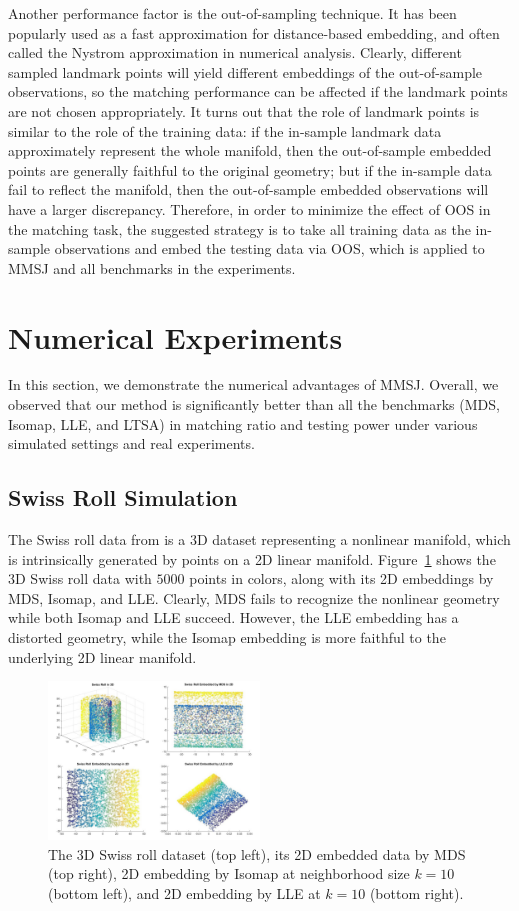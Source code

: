 \documentclass[times,twocolumn,final]{elsarticle}
\begin{document}
Another performance factor is the out-of-sampling technique. It has been popularly used as a fast approximation for distance-based embedding, and often called the Nystrom approximation \cite{Mahoney2005} in numerical analysis. Clearly, different sampled landmark points will yield different embeddings of the out-of-sample observations, so the matching performance can be affected if the landmark points are not chosen appropriately. It turns out that the role of landmark points is similar to the role of the training data: if the in-sample landmark data approximately represent the whole manifold, then the out-of-sample embedded points are generally faithful to the original geometry; but if the in-sample data fail to reflect the manifold, then the out-of-sample embedded observations will have a larger discrepancy. Therefore, in order to minimize the effect of OOS in the matching task, the suggested strategy is to take all training data as the in-sample observations and embed the testing data via OOS, which is applied to MMSJ and all benchmarks in the experiments.

\section{Numerical Experiments}
\label{numer}
In this section, we demonstrate the numerical advantages of MMSJ. Overall, we observed that our method is significantly better than all the benchmarks (MDS, Isomap, LLE, and LTSA) in matching ratio and testing power under various simulated settings and real experiments.

\subsection{Swiss Roll Simulation}
The Swiss roll data from \citep{TenenbaumSilvaLangford2000} is a 3D dataset representing a nonlinear manifold, which is intrinsically generated by points on a 2D linear manifold. Figure~\ref{fig1} shows the 3D Swiss roll data with $5000$ points in colors, along with its 2D embeddings by MDS, Isomap, and LLE. Clearly, MDS fails to recognize the nonlinear geometry while both Isomap and LLE succeed. However, the LLE embedding has a distorted geometry, while the Isomap embedding is more faithful to the underlying 2D linear manifold.

\begin{figure}[htbp]
\centering
\includegraphics[width=0.5\textwidth]{Swiss.png}
\caption{The 3D Swiss roll dataset (top left), its 2D embedded data by MDS (top right), 2D embedding by Isomap at neighborhood size $k=10$ (bottom left), and 2D embedding by LLE at $k=10$ (bottom right).}
\label{fig1}
\end{figure}
\end{document}
